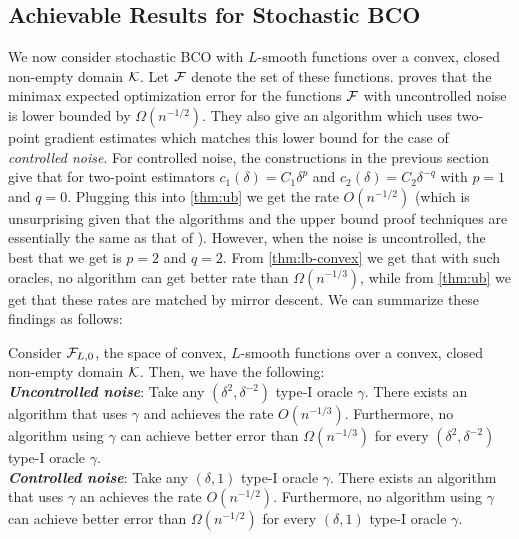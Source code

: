 

\subsection{Achievable Results for Stochastic BCO}
We now consider stochastic BCO with $L$-smooth functions over a convex, closed non-empty domain $\mathcal{K}$. 
Let $\mathcal{F}$ denote the set of these functions.
\cite{duchi2015optimal} proves that the minimax expected optimization error
for the functions $\mathcal{F}$ with uncontrolled noise is lower bounded by $\Omega(n^{-1/2})$. 
They also give an algorithm which uses two-point gradient estimates which matches this lower bound for the case of \emph{controlled noise}.
For controlled noise, the constructions in the previous section give that for two-point estimators $c_1(\delta) = C_1 \delta^p$ and $c_2(\delta) = C_2\delta^{-q}$ with $p=1$ and $q=0$. Plugging this into
\cref{thm:ub} we get the rate $O(n^{-1/2})$ (which is unsurprising
given that the algorithms and the upper bound proof techniques are essentially the same as that of \citealp{duchi2015optimal}).
However, when the noise is uncontrolled, the best that we get is $p=2$ and $q=2$.
From \cref{thm:lb-convex} we get that with such oracles, no algorithm can get better rate than $\Omega(n^{-1/3})$, while from
\cref{thm:ub} we get that these rates are matched by mirror descent.
We can summarize these findings as follows:
\begin{theorem}\label{thm:aaab}
Consider $\mathcal{F}_{L,0}$, the space of convex, $L$-smooth functions over a convex, closed non-empty domain $\mathcal{K}$.
Then, we have the following:\\
\textit{\textbf{Uncontrolled noise}}:
Take any $(\delta^2,\delta^{-2})$ type-I oracle $\gamma$.
There exists an algorithm that uses $\gamma$
and achieves the rate $O(n^{-1/3})$.
Furthermore, no algorithm using $\gamma$
 can achieve better error than $\Omega(n^{-1/3})$ for every $(\delta^2,\delta^{-2})$ type-I oracle $\gamma$.\\
\textit{\textbf{Controlled noise}}:
Take any $(\delta,1)$ type-I oracle $\gamma$.
There exists an algorithm that uses $\gamma$ an
achieves the rate $O(n^{-1/2})$.
Furthermore, no algorithm using $\gamma$
 can achieve better error than $\Omega(n^{-1/2})$ for every $(\delta,1)$ type-I oracle $\gamma$.
\end{theorem}

